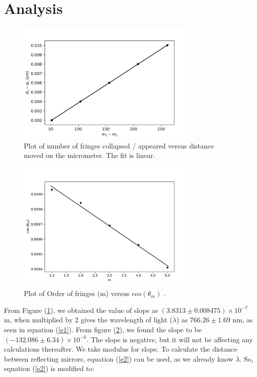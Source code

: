 \documentclass[a4paper, amsfonts, amssymb, amsmath, reprint, showkeys, nofootinbib, twoside]{revtex4-1}
\begin{document}
\section{Analysis}
\begin{figure}[H] %
   \centering
   \includegraphics[width=3.5in]{g1} 
   \caption{Plot of number of fringes collapsed / appeared versus distance moved on the micrometer. The fit is linear.}
   \label{g1}
\end{figure}

\begin{figure}[H] %
   \centering
   \includegraphics[width=3.5in]{g2} 
   \caption{Plot of Order of fringes (m) versus $cos(\theta_m)$ .}
   \label{g2}
\end{figure}

From Figure (\ref{g1}), we obtained the value of slope as $(3.8313\pm 0.008475)\times10^{-7}$ m, when multiplied by 2 gives the wavelength of light ($\lambda$) as $766.26\pm1.69$ nm, as seen in equation (\ref{e1}). From figure (\ref{g2}), we found the slope to be $(-132.086\pm6.34)\times10^{-6}$. The slope is negative, but it will not be affecting any calculations thereafter. We take modulus for slope. To calculate the distance between reflecting mirrors, equation (\ref{e2}) can be used, as we already know $\lambda$. So, equation (\ref{e2}) is modified to:
\end{document}
